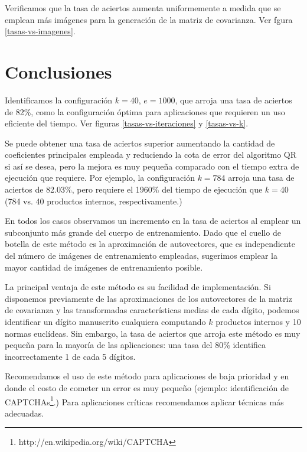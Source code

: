 \documentclass[a4paper,10pt,twoside]{article}
\begin{document}
Verificamos que la tasa de aciertos aumenta uniformemente a medida que se emplean más imágenes para la generación de la matriz de covarianza. Ver fgura \ref{tasas-vs-imagenes}.




\section{Conclusiones}

Identificamos la configuración $k = 40$, $e = 1000$, que arroja una tasa de aciertos de 82\%, como la configuración óptima para aplicaciones que requieren un uso eficiente del tiempo. Ver figuras \ref{tasas-vs-iteraciones} y \ref{tasas-vs-k}.

Se puede obtener una tasa de aciertos superior aumentando la cantidad de coeficientes principales empleada y reduciendo la cota de error del algoritmo QR si así se desea, pero la mejora es muy pequeña comparado con el tiempo extra de ejecución que requiere. Por ejemplo, la configuración $k = 784$ arroja una tasa de aciertos de 82.03\%, pero requiere el 1960\% del tiempo de ejecución que $k = 40$ (784 vs. 40 productos internos, respectivamente.)

En todos los casos observamos un incremento en la tasa de aciertos al emplear un subconjunto más grande del cuerpo de entrenamiento. Dado que el cuello de botella de este método es la aproximación de autovectores, que es independiente del número de imágenes de entrenamiento empleadas, sugerimos emplear la mayor cantidad de imágenes de entrenamiento posible.

La principal ventaja de este método es su facilidad de implementación. Si disponemos previamente de las aproximaciones de los autovectores de la matriz de covarianza y las transformadas características medias de cada dígito, podemos identificar un dígito manuscrito cualquiera computando $k$ productos internos y 10 normas euclídeas. Sin embargo, la tasa de aciertos que arroja este método es muy pequeña para la mayoría de las aplicaciones: una tasa del 80\% identifica incorrectamente 1 de cada 5 dígitos.

Recomendamos el uso de este método para aplicaciones de baja prioridad y en donde el costo de cometer un error es muy pequeño (ejemplo: identificación de CAPTCHAs\footnote{http://en.wikipedia.org/wiki/CAPTCHA}.) Para aplicaciones críticas recomendamos aplicar técnicas más adecuadas.
\end{document}
